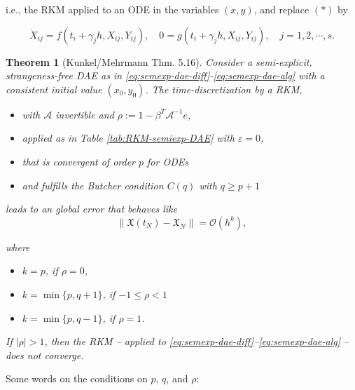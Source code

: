 \documentclass[]{book}
\providecommand{\tightlist}{%
  \setlength{\itemsep}{0pt}\setlength{\parskip}{0pt}}
\newtheorem{theorem}{Theorem}[chapter]
\theoremstyle{definition}
\theoremstyle{definition}
\theoremstyle{definition}
\theoremstyle{definition}
\theoremstyle{remark}
\begin{document}
i.e., the RKM applied to an ODE in the variables \((x,y)\), and replace \((*)\) by

\[
\dot X_{ij} = f(t_i+\gamma_jh, X_{ij}, Y_{ij}),\quad 0 = g(t_i+\gamma_j h, X_{ij}, Y_{ij}), \quad j=1,2,\cdots,s.
\]

\begin{theorem}[Kunkel/Mehrmann Thm. 5.16]
\protect\hypertarget{thm:unnamed-chunk-1}{}{\label{thm:unnamed-chunk-1} {} }Consider a semi-explicit, strangeness-free DAE as in \eqref{eq:semexp-dae-diff}-\eqref{eq:semexp-dae-alg} with a consistent initial value \((x_0, y_0)\). The time-discretization by a RKM,

\begin{itemize}
\tightlist
\item
  with \(\mathcal A\) invertible and \(\rho:=1-\beta^T\mathcal A^{-1}e\),
\item
  applied as in Table \ref{tab:RKM-semiexp-DAE} with \(\varepsilon=0\),
\item
  that is convergent of order \(p\) for ODEs
\item
  and fulfills the \emph{Butcher condition} \(C(q)\) with \(q\geq p+1\)
\end{itemize}

leads to an global error that behaves like
\[
\|\mathfrak X(t_N) - \mathfrak X_N\| = \mathcal O(h^k),
\]

where

\begin{itemize}
\tightlist
\item
  \(k=p\), if \(\rho=0\),
\item
  \(k=\min\{p, q+1\}\), if \(-1\leq \rho < 1\)
\item
  \(k=\min\{p, q-1\}\), if \(\rho =1\).
\end{itemize}

If \(|\rho|>1\), then the RKM -- applied to \eqref{eq:semexp-dae-diff}--\eqref{eq:semexp-dae-alg} -- does not converge.
\end{theorem}

Some words on the conditions on \(p\), \(q\), and \(\rho\):
\end{document}
